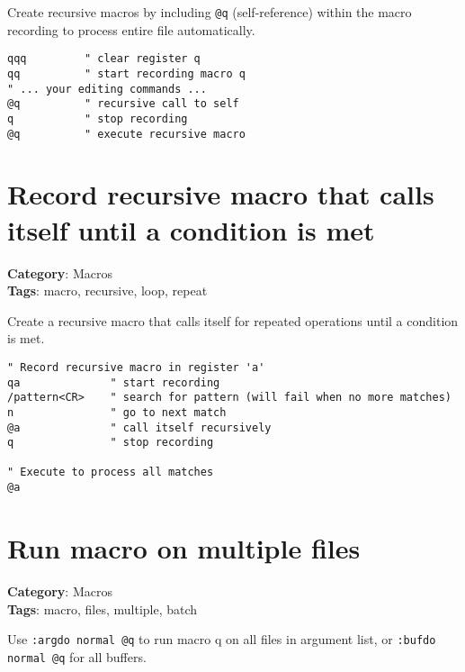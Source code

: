{{{{{{{Create recursive macros by including {\footnotesize \Verb§@q§} (self-reference) within the macro recording to process entire file automatically.

\begin{Exa*}{}
\begin{Verbatim}[fontsize=\footnotesize, breaklines, breakanywhere]
qqq         " clear register q
qq          " start recording macro q
" ... your editing commands ...
@q          " recursive call to self
q           " stop recording
@q          " execute recursive macro
\end{Verbatim}
\end{Exa*}

\section{Record recursive macro that calls itself until a condition is met}

\textbf{Category}: Macros\\ \textbf{Tags}: macro, recursive, loop, repeat
\vspace{0.5cm}

Create a recursive macro that calls itself for repeated operations until a condition is met.

\begin{Exa*}{}
\begin{Verbatim}[fontsize=\footnotesize, breaklines, breakanywhere]
" Record recursive macro in register 'a'
qa              " start recording
/pattern<CR>    " search for pattern (will fail when no more matches)
n               " go to next match
@a              " call itself recursively
q               " stop recording

" Execute to process all matches
@a
\end{Verbatim}
\end{Exa*}

\section{Run macro on multiple files}

\textbf{Category}: Macros\\ \textbf{Tags}: macro, files, multiple, batch
\vspace{0.5cm}

Use {\footnotesize \Verb§:argdo normal @q§} to run macro q on all files in argument list, or {\footnotesize \Verb§:bufdo normal @q§} for all buffers.

}}}}}}}
